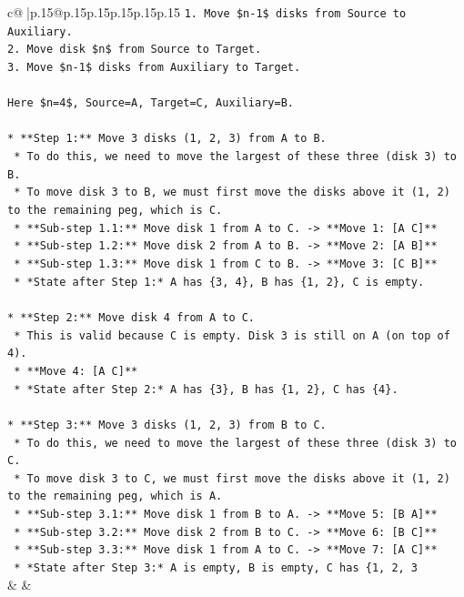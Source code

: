 \documentclass{article}
\begin{document}
{\begin{supertabular}{c@{$\;$}|p{.15\linewidth}@{}p{.15\linewidth}p{.15\linewidth}p{.15\linewidth}p{.15\linewidth}p{.15\linewidth}}
{{{\texttt{1.  Move \$n{-}1\$ disks from Source to Auxiliary.} \\
\texttt{2.  Move disk \$n\$ from Source to Target.} \\
\texttt{3.  Move \$n{-}1\$ disks from Auxiliary to Target.} \\
\\ 
\texttt{Here \$n=4\$, Source=A, Target=C, Auxiliary=B.} \\
\\ 
\texttt{*   **Step 1:** Move 3 disks (1, 2, 3) from A to B.} \\
\texttt{    *   To do this, we need to move the largest of these three (disk 3) to B.} \\
\texttt{    *   To move disk 3 to B, we must first move the disks above it (1, 2) to the remaining peg, which is C.} \\
\texttt{    *   **Sub{-}step 1.1:** Move disk 1 from A to C. {-}> **Move 1: {[}A C{]}**} \\
\texttt{    *   **Sub{-}step 1.2:** Move disk 2 from A to B. {-}> **Move 2: {[}A B{]}**} \\
\texttt{    *   **Sub{-}step 1.3:** Move disk 1 from C to B. {-}> **Move 3: {[}C B{]}**} \\
\texttt{    *   *State after Step 1:* A has \{3, 4\}, B has \{1, 2\}, C is empty.} \\
\\ 
\texttt{*   **Step 2:** Move disk 4 from A to C.} \\
\texttt{    *   This is valid because C is empty. Disk 3 is still on A (on top of 4).} \\
\texttt{    *   **Move 4: {[}A C{]}**} \\
\texttt{    *   *State after Step 2:* A has \{3\}, B has \{1, 2\}, C has \{4\}.} \\
\\ 
\texttt{*   **Step 3:** Move 3 disks (1, 2, 3) from B to C.} \\
\texttt{    *   To do this, we need to move the largest of these three (disk 3) to C.} \\
\texttt{    *   To move disk 3 to C, we must first move the disks above it (1, 2) to the remaining peg, which is A.} \\
\texttt{    *   **Sub{-}step 3.1:** Move disk 1 from B to A. {-}> **Move 5: {[}B A{]}**} \\
\texttt{    *   **Sub{-}step 3.2:** Move disk 2 from B to C. {-}> **Move 6: {[}B C{]}**} \\
\texttt{    *   **Sub{-}step 3.3:** Move disk 1 from A to C. {-}> **Move 7: {[}A C{]}**} \\
\texttt{    *   *State after Step 3:* A is empty, B is empty, C has \{1, 2, 3} \\
            }
        }
    }
    & & \\ \\


\end{supertabular}}
\end{document}
